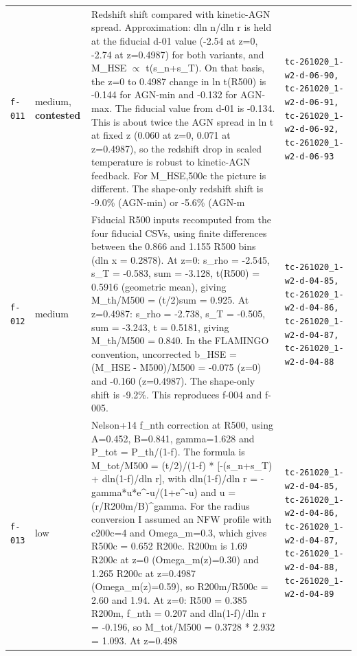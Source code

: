 \documentclass[11pt,a4paper]{article}
\begin{document}
\begin{longtable}{@{}p{}p{}p{}p{}@{}}
\texttt{f-011} & medium, \textbf{contested} & Redshift shift compared with kinetic-AGN spread. Approximation: dln n/dln r is held at the fiducial d-01 value (-2.54 at z=0, -2.74 at z=0.4987) for both variants, and M\_HSE $\propto$ t(s\_n+s\_T). On that basis, the z=0 to 0.4987 change in ln t(R500) is -0.144 for AGN-min and -0.132 for AGN-max. The fiducial value from d-01 is -0.134. This is about twice the AGN spread in ln t at fixed z (0.060 at z=0, 0.071 at z=0.4987), so the redshift drop in scaled temperature is robust to kinetic-AGN feedback. For M\_HSE,500c the picture is different. The shape-only redshift shift is -9.0\% (AGN-min) or -5.6\% (AGN-m & \texttt{tc-261020\_\allowbreak{}1-w2-d-06-90,\allowbreak{} tc-261020\_\allowbreak{}1-w2-d-06-91,\allowbreak{} tc-261020\_\allowbreak{}1-w2-d-06-92,\allowbreak{} tc-261020\_\allowbreak{}1-w2-d-06-93} \\
\texttt{f-012} & medium & Fiducial R500 inputs recomputed from the four fiducial CSVs, using finite differences between the 0.866 and 1.155 R500 bins (dln x = 0.2878). At z=0: s\_rho = -2.545, s\_T = -0.583, sum = -3.128, t(R500) = 0.5916 (geometric mean), giving M\_th/M500 = (t/2)\textbar{}sum\textbar{} = 0.925. At z=0.4987: s\_rho = -2.738, s\_T = -0.505, sum = -3.243, t = 0.5181, giving M\_th/M500 = 0.840. In the FLAMINGO convention, uncorrected b\_HSE = (M\_HSE - M500)/M500 = -0.075 (z=0) and -0.160 (z=0.4987). The shape-only shift is -9.2\%. This reproduces f-004 and f-005. & \texttt{tc-261020\_\allowbreak{}1-w2-d-04-85,\allowbreak{} tc-261020\_\allowbreak{}1-w2-d-04-86,\allowbreak{} tc-261020\_\allowbreak{}1-w2-d-04-87,\allowbreak{} tc-261020\_\allowbreak{}1-w2-d-04-88} \\
\texttt{f-013} & low & Nelson+14 f\_nth correction at R500, using A=0.452, B=0.841, gamma=1.628 and P\_tot = P\_th/(1-f). The formula is M\_tot/M500 = (t/2)/(1-f) * [-(s\_n+s\_T) + dln(1-f)/dln r], with dln(1-f)/dln r = -gamma*u*e\textasciicircum{}-u/(1+e\textasciicircum{}-u) and u = (r/R200m/B)\textasciicircum{}gamma. For the radius conversion I assumed an NFW profile with c200c=4 and Omega\_m=0.3, which gives R500c = 0.652 R200c. R200m is 1.69 R200c at z=0 (Omega\_m(z)=0.30) and 1.265 R200c at z=0.4987 (Omega\_m(z)=0.59), so R200m/R500c = 2.60 and 1.94. At z=0: R500 = 0.385 R200m, f\_nth = 0.207 and dln(1-f)/dln r = -0.196, so M\_tot/M500 = 0.3728 * 2.932 = 1.093. At z=0.498 & \texttt{tc-261020\_\allowbreak{}1-w2-d-04-85,\allowbreak{} tc-261020\_\allowbreak{}1-w2-d-04-86,\allowbreak{} tc-261020\_\allowbreak{}1-w2-d-04-87,\allowbreak{} tc-261020\_\allowbreak{}1-w2-d-04-88,\allowbreak{} tc-261020\_\allowbreak{}1-w2-d-04-89} \\

\end{longtable}
\end{document}
